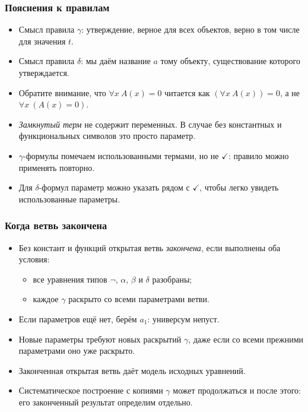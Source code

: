 \documentclass[10pt]{beamer}
\begin{document}
\begin{frame}
\frametitle{Пояснения к правилам}
\begin{itemize}
    \item Смысл правила $\gamma$: утверждение, верное для всех объектов, верно в том числе для значения $t$.
    \item Смысл правила $\delta$: мы даём название $a$ тому объекту, существование которого утверждается. \pause 
    \item Обратите внимание, что $\forall x ~ A(x) = 0$ читается как \pause $(\forall x ~ A(x)) = 0$, а не $\forall x ~ (A(x) = 0)$. \pause
    \item \emph{Замкнутый терм} не содержит переменных. В случае без константных и функциональных символов это просто параметр. \pause
    \item $\gamma$-формулы помечаем использованными термами, но не $\checkmark$: правило можно применять повторно.
    \item Для $\delta$-формул параметр можно указать рядом с $\checkmark$, чтобы легко увидеть использованные параметры.
\end{itemize}
\end{frame}

\begin{frame}
\frametitle{Когда ветвь закончена}
\begin{itemize}
    \item Без констант и функций открытая ветвь \emph{закончена}, если выполнены оба условия:
    \begin{itemize}
        \item все уравнения типов $\neg$, $\alpha$, $\beta$ и $\delta$ разобраны;
        \item каждое $\gamma$ раскрыто со всеми параметрами ветви.
    \end{itemize}
    \item Если параметров ещё нет, берём $a_1$: универсум непуст.
    \pause
    \item Новые параметры требуют новых раскрытий $\gamma$, даже если со всеми прежними параметрами оно уже раскрыто.
    \item Законченная открытая ветвь даёт модель исходных уравнений.
    \item Систематическое построение с копиями $\gamma$ может продолжаться и после этого: его законченный результат определим отдельно.
\end{itemize}
\end{frame}
\end{document}
